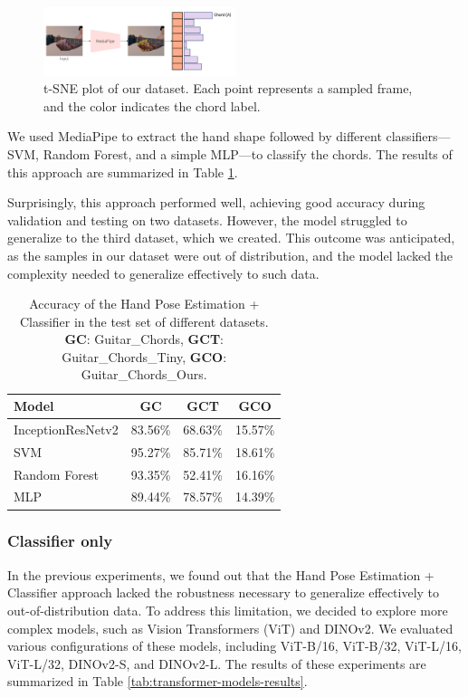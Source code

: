 \documentclass[10pt,twocolumn,letterpaper]{article}
\begin{document}
\begin{figure}[h]
  \centering
  \includegraphics[width=0.5\textwidth]{images/final/hand_pose_estimation_classifier.png}
  \caption{t-SNE plot of our dataset. Each point represents a sampled frame, and the color indicates the chord label. }
  \label{fig:ours-tsne-plot}
\end{figure}

We used MediaPipe to extract the hand shape followed by different classifiers—SVM, Random Forest, and a simple MLP—to classify the chords. The results of this approach are summarized in Table \ref{tab:handpose-classifier-results}.

Surprisingly, this approach performed well, achieving good accuracy during validation and testing on two datasets. However, the model struggled to generalize to the third dataset, which we created. This outcome was anticipated, as the samples in our dataset were out of distribution, and the model lacked the complexity needed to generalize effectively to such data.


\begin{table}[h]
  \centering
  \begin{tabular}{lccc}
    \toprule
    \textbf{Model} & \textbf{GC} & \textbf{GCT} & \textbf{GCO} \\
    \midrule
 InceptionResNetv2 & 83.56\% & 68.63\% & 15.57\% \\
    \midrule
 SVM & 95.27\% & 85.71\% & 18.61\% \\
 Random Forest & 93.35\% & 52.41\% & 16.16\%  \\
 MLP & 89.44\% & 78.57\% & 14.39\% \\
    \bottomrule
  \end{tabular}
  \caption{Accuracy of the Hand Pose Estimation + Classifier in the test set of different datasets. \textbf{GC}: Guitar\_Chords, \textbf{GCT}: Guitar\_Chords\_Tiny, \textbf{GCO}: Guitar\_Chords\_Ours.}
  \label{tab:handpose-classifier-results}
\end{table}

\subsubsection{Classifier only}
In the previous experiments, we found out that the Hand Pose Estimation + Classifier approach lacked the robustness necessary to generalize effectively to out-of-distribution data. To address this limitation, we decided to explore more complex models, such as Vision Transformers (ViT) and DINOv2. We evaluated various configurations of these models, including ViT-B/16, ViT-B/32, ViT-L/16, ViT-L/32, DINOv2-S, and DINOv2-L. The results of these experiments are summarized in Table \ref{tab:transformer-models-results}.
\end{document}

